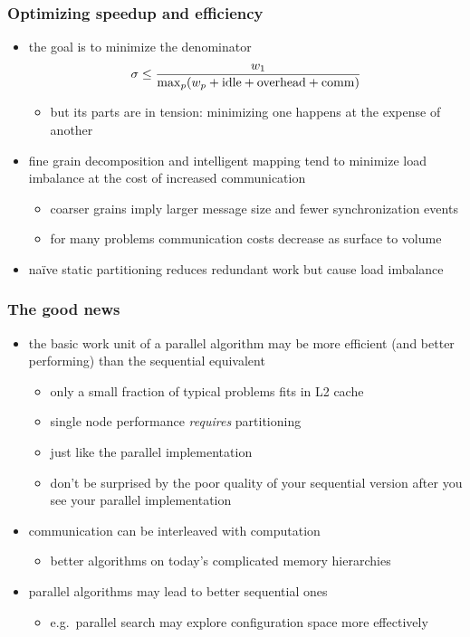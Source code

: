 \begin{frame}[fragile]
%
  \frametitle{Optimizing speedup and efficiency}
  \begin{itemize}
%
    \item the goal is to minimize the denominator
      \[
      \sigma \leq \frac{w_{1}}{{\rm max}_{p}(w_{p} + {\rm idle} + {\rm overhead} + {\rm comm})}
      \]
      \begin{itemize}
        \item but its parts are in tension: minimizing one happens at the expense of another
      \end{itemize}
%
  \item fine grain decomposition and intelligent mapping tend to minimize load imbalance at the
    cost of increased communication
    \begin{itemize}
    \item coarser grains imply larger message size and fewer synchronization events
    \item for many problems communication costs decrease as surface to volume
    \end{itemize}
%
  \item na\"ive static partitioning reduces redundant work but cause load imbalance
%
  \end{itemize}
%
\end{frame}

\begin{frame}[fragile]
%
  \frametitle{The good news}
%
  \begin{itemize}
%
  \item the basic work unit of a parallel algorithm may be more efficient (and better
    performing) than the sequential equivalent
    \begin{itemize}
    \item only a small fraction of typical problems fits in L2 cache
    \item single node performance {\em requires} partitioning
    \item just like the parallel implementation
    \item don't be surprised by the poor quality of your sequential version after you see
      your parallel implementation
    \end{itemize}
%
  \item communication can be interleaved with computation
    \begin{itemize}
    \item better algorithms on today's complicated memory hierarchies
    \end{itemize}
%
    \item parallel algorithms may lead to better sequential ones
      \begin{itemize}
        \item e.g.~parallel search may explore configuration space more effectively
      \end{itemize}
%
  \end{itemize}
%
\end{frame}

